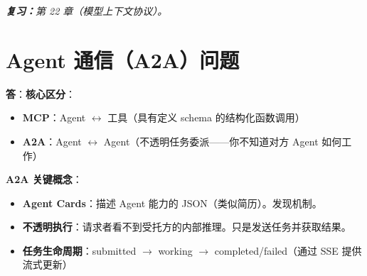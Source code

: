 \begin{questionbox}
\emph{\textbf{复习：}第 22 章（模型上下文协议）。}
\end{questionbox}

\section{Agent 通信（A2A）问题}
\label{agent-communication-a2a-questions}

\begin{questionbox}
\textbf{答}：\textbf{核心区分}：

\begin{itemize}
  \item \textbf{MCP}：Agent $\leftrightarrow$ 工具（具有定义 schema 的结构化函数调用）
  \item \textbf{A2A}：Agent $\leftrightarrow$ Agent（不透明任务委派——你不知道对方 Agent 如何工作）
\end{itemize}

\textbf{A2A 关键概念}：

\begin{itemize}
  \item \textbf{Agent Cards}：描述 Agent 能力的 JSON（类似简历）。发现机制。
  \item \textbf{不透明执行}：请求者看不到受托方的内部推理。只是发送任务并获取结果。
  \item \textbf{任务生命周期}：submitted $\to$ working $\to$ completed/failed（通过 SSE 提供流式更新）
\end{itemize}


\end{questionbox}
